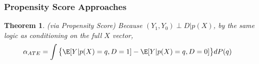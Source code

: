 \documentclass[12pt]{article}
\theoremstyle{plain}
\newtheorem{thm}{Theorem}[section]
\theoremstyle{definition}
\theoremstyle{remark}
\begin{document}
\clearpage
\subsubsection{Propensity Score Approaches}


\begin{thm}
\emph{(via Propensity Score)}
Because $(Y_1,Y_0)\perp D|p(X)$, by the same logic as conditioning
on the full $X$ vector,
\begin{align*}
  \alpha_{ATE}
  &=
  \int
  \big\{
  \E[Y|p(X)=q,D=1]
  -
  \E[Y|p(X)=q,D=0]
  \big\}
  dP(q)
\end{align*}
\end{thm}
\end{document}
